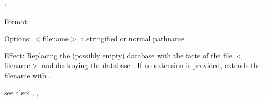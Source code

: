 :

Format: 

Options: $<$filename$>$ a stringified or normal pathname

Effect: Replacing the (possibly empty) database  with the facts 
	of the file $<$filename$>$ and destroying the database .
	If no extension is provided, \COLAB{} extends the filename with .

see also: \consult, \destroy, \replace
